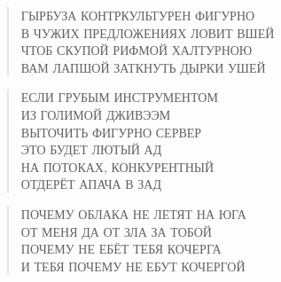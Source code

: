 \poemtitle{***}
\begin{verse}
ГЫРБУЗА КОНТРКУЛЬТУРЕН ФИГУРНО\\
В ЧУЖИХ ПРЕДЛОЖЕНИЯХ ЛОВИТ ВШЕЙ\\
ЧТОБ СКУПОЙ РИФМОЙ ХАЛТУРНОЮ\\
ВАМ ЛАПШОЙ ЗАТКНУТЬ ДЫРКИ УШЕЙ
\end{verse}

\poemtitle{***}
\begin{verse}
ЕСЛИ ГРУБЫМ ИНСТРУМЕНТОМ \\
ИЗ ГОЛИМОЙ ДЖИВЭЭМ\\
ВЫТОЧИТЬ ФИГУРНО СЕРВЕР\\
ЭТО БУДЕТ ЛЮТЫЙ АД\\
НА ПОТОКАХ, КОНКУРЕНТНЫЙ\\
ОТДЕРЁТ АПАЧА В ЗАД
\end{verse}

\poemtitle{***}
\begin{verse}
ПОЧЕМУ ОБЛАКА НЕ ЛЕТЯТ НА ЮГА\\
ОТ МЕНЯ ДА ОТ ЗЛА ЗА ТОБОЙ\\
ПОЧЕМУ НЕ ЕБЁТ ТЕБЯ КОЧЕРГА\\
И ТЕБЯ ПОЧЕМУ НЕ ЕБУТ КОЧЕРГОЙ
\end{verse}

